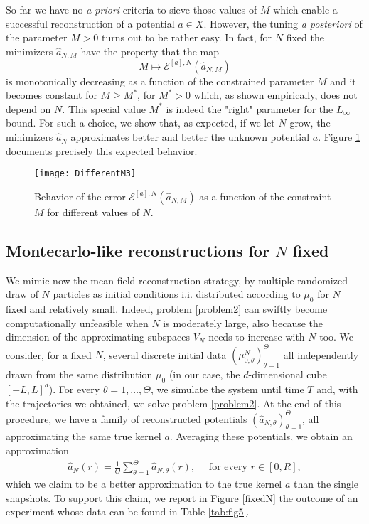 So far we have no  {\it a priori} criteria to sieve those values of $M$ which enable a successful reconstruction of a potential $a \in X$. However,  the tuning {\it a posteriori} of the parameter $M>0$ turns out to be rather easy. In fact, for $N$ fixed the minimizers $\widehat a_{N,M}$ have the property that the map
$$
 M \mapsto   \mathcal E^{[a],N}(\widehat a_{N,M})
$$
is monotonically decreasing as a function of the constrained parameter $M$ and it becomes constant for $M\geq M^*$, for $M^*>0$ which, as shown empirically, does not depend on $N$. This special value $M^*$ is indeed the "right" parameter for the $L_\infty$ bound. For such a choice, we show that, as expected, if we let $N$ grow, the minimizers $\widehat{a}_N$ approximates better and better the unknown potential $a$. 
Figure \ref{Mconstr} documents precisely this expected behavior.

\begin{figure}[h!]
\begin{center}
\texttt{[image: DifferentM3]}
\end{center}
\caption{Behavior of the error $\mathcal E^{[a],N}(\widehat a_{N,M})$ as a function of the constraint $M$ for different values of $N$.}\label{Mconstr}
\end{figure}

\subsection{Montecarlo-like reconstructions for $N$ fixed}

We mimic now the  mean-field reconstruction strategy, by multiple randomized draw of $N$ particles as initial conditions i.i. distributed according to $\mu_0$ for $N$ fixed and relatively small. Indeed, problem \eqref{problem2} can swiftly become computationally unfeasible when $N$ is moderately large, also because the dimension of the approximating subspaces $V_N$ needs to increase with $N$ too.  We consider, for a fixed $N$, several discrete initial data $(\mu^N_{0,\theta})_{\theta= 1}^{\Theta}$ all independently drawn from the same distribution $\mu_0$ (in our case, the $d$-dimensional cube $[-L,L]^d$). For every $\theta = 1,\ldots,\Theta$, we simulate the system until time $T$ and, with the trajectories we obtained, we solve problem \eqref{problem2}. At the end of this procedure, we have a family of reconstructed potentials $(\widehat{a}_{N,\theta})_{\theta= 1}^{\Theta}$, all approximating the same true kernel $a$. Averaging these potentials, we obtain an approximation
\begin{align*}
\widehat{a}_N(r) = \frac{1}{\Theta} \sum^{\Theta}_{\theta = 1}\widehat{a}_{N,\theta}(r), \quad \text{ for every } r \in [0,R],
\end{align*}
which we claim to be a better approximation to the true kernel $a$ than the single snapshots. To support this claim, we report in Figure \ref{fixedN} the outcome of an experiment whose data can be found in Table \ref{tab:fig5}.

